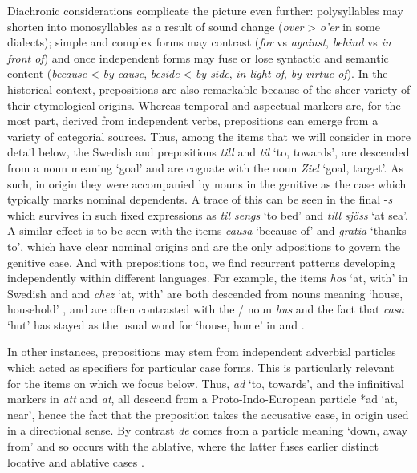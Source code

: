 \documentclass[output=paper]{langsci/langscibook}
\begin{document}
Diachronic considerations complicate the picture even further: polysyllables
may shorten into monosyllables as a result of sound change (\emph{over} >
\emph{o'er} in some dialects); simple and complex forms may contrast
(\emph{for} vs \emph{against}, \emph{behind} vs \emph{in front of}) and once
independent forms may fuse or lose syntactic and semantic content
(\emph{because} < \emph{by cause}, \emph{beside} < \emph{by side}, \emph{in
light of}, \emph{by virtue of}). In the historical context, prepositions are
also remarkable because of the sheer variety of their etymological origins.
Whereas temporal and aspectual markers are, for the most part, derived from
independent verbs, prepositions can emerge from a variety of categorial
sources. Thus, among the items that we will consider in more detail below, the
Swedish and  prepositions \emph{till} and \emph{til} `to, towards',
are descended from a noun meaning `goal' and are cognate with the 
noun \emph{Ziel} `goal, target'. As such, in origin they were accompanied by
nouns in the genitive as the case which typically marks
nominal dependents. A trace of this can be seen in the final -\emph{s} which
survives in such fixed expressions as  \emph{til sengs} `to bed'
and  \emph{till sj\"{o}ss} `at sea'. A similar effect is to be
seen with the  items \emph{causa} `because of' and \emph{gratia}
`thanks to', which have clear nominal origins and are the only 
adpositions to govern the genitive case.  And with
prepositions too, we find recurrent patterns developing independently within
different languages. For example, the items \emph{hos} `at, with' in Swedish
and  and  \emph{chez} `at, with' are both descended
from nouns meaning `house, household' \citep{Plank15}, and are often contrasted
with the / noun \emph{hus} and the fact that
 \emph{casa} `hut' has stayed as the usual word for `house, home' in
 and .

In other instances, prepositions may stem from independent adverbial particles
which acted as specifiers for particular case forms. This is particularly
relevant for the items on which we focus below. Thus,  \emph{ad}
`to, towards', and the infinitival markers in  \emph{att} and
 \emph{at}, all descend from a Proto-Indo-European particle *ad
`at, near', hence the fact that the  preposition takes the
accusative case, in origin used in a directional sense. By
contrast  \emph{de} comes from a particle meaning `down, away from'
and so occurs with the ablative, where the latter fuses earlier distinct
locative and ablative cases \citep{Vincent99,Vincent17}.
\end{document}
